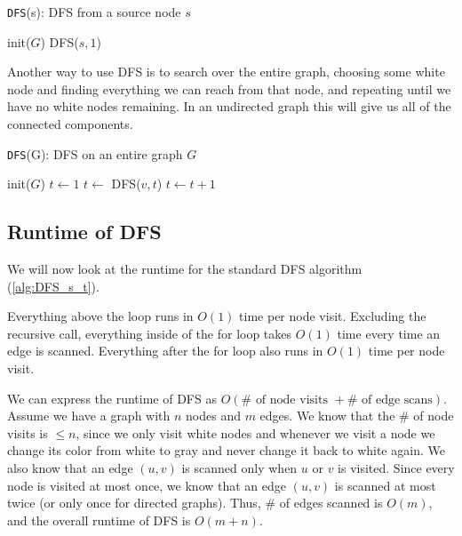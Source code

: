 \documentclass [12pt]{article}
\begin{document}
\begin{algorithm}
\caption{\texttt{DFS}(s): DFS from a source node $s$}
\label{alg:DFS_s}
\begin{algorithmic}
\STATE init($G$)
\STATE DFS($s, 1$)
\end{algorithmic}
\end{algorithm}

Another way to use DFS is to search over the entire graph, choosing some white node and finding everything we can reach from that node, and repeating until we have no white nodes remaining. In an undirected graph this will give us all of the connected components.

\begin{algorithm}
\caption{\texttt{DFS}(G): DFS on an entire graph $G$}
\label{alg:DFS_G}
\begin{algorithmic}
\STATE init($G$)
\STATE $t \gets 1$
    \STATE $t \gets$ DFS($v,t$)
    \STATE $t \gets t+1$
  \ENDIF
\ENDFOR
\end{algorithmic}
\end{algorithm}

\subsection{Runtime of DFS} 

We will now look at the runtime for the standard DFS algorithm (\ref{alg:DFS_s_t}). 

Everything above the loop runs in $O(1)$ time per node visit. Excluding the recursive call, everything inside of the for loop takes $O(1)$ time every time an edge is scanned. Everything after the for loop also runs in $O(1)$ time per node visit. 

We can express the runtime of DFS as $O(\#\text{ of node visits }+ \# \text{ of edge scans})$. Assume we have a graph with $n$ nodes and $m$ edges. We know that the \# of node visits is $\leq n$, since we only visit white nodes and whenever we visit a node we change its color from white to gray and never change it back to white again. We also know that an edge $(u, v)$ is scanned only when $u$ or $v$ is visited. Since every node is visited at most once, we know that an edge $(u, v)$ is scanned at most twice (or only once for directed graphs). Thus, \# of edges scanned is $O(m)$, and the overall runtime of DFS is $O(m + n)$.
\end{document}
